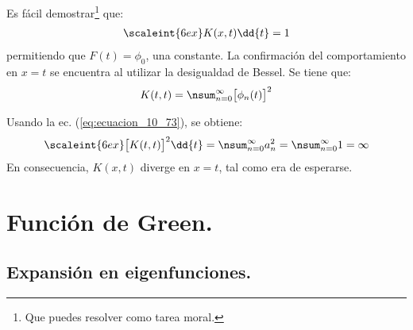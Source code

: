 Es fácil demostrar\footnote{Que puedes resolver como tarea moral.} que:
\begin{align}
\scaleint{6ex} K (x, t) \dd{t} = 1
\label{eq:ecuacion_09_83}
\end{align}
permitiendo que $F (t) = \phi_{0}$, una constante. La confirmación del comportamiento en $x = t$ se encuentra al utilizar la desigualdad de Bessel. Se tiene que:
\begin{align}
K (t, t) = \nsum_{n=0}^{\infty} \big[ \phi_{n} (t) \big]^{2}
\label{eq:ecuacion_09_84}
\end{align}

Usando la ec. (\ref{eq:ecuacion_10_73}), se obtiene:
\begin{align}
\scaleint{6ex} \big[ K (t, t) \big]^{2} \dd{t} = \nsum_{n=0}^{\infty} a_{n}^{2} = \nsum_{n=0}^{\infty} 1 = \infty
\label{eq:ecuacion_09_85}
\end{align}
En consecuencia, $K(x, t)$ diverge en $x = t$, tal como era de esperarse.

\section{Función de Green.}

\subsection{Expansión en eigenfunciones.}

